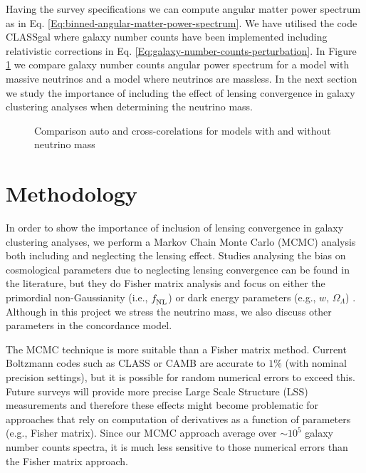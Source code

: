 Having the survey specifications we can compute angular matter power spectrum as in Eq. \eqref{Eq:binned-angular-matter-power-spectrum}. We have utilised the code CLASSgal \cite{DiDio:2013bqa} where galaxy number counts have been implemented including relativistic corrections in Eq. \eqref{Eq:galaxy-number-counts-perturbation}. In Figure \ref{Fig:comparison-massive-massless-Cls} we compare galaxy number counts angular power spectrum for a model with massive neutrinos and a model where neutrinos are massless. In the next section we study the importance of including the effect of lensing convergence in galaxy clustering analyses when determining the neutrino mass. 

\begin{figure}[hbtp]
\centering
\caption{Comparison auto and cross-corelations for models with and without neutrino mass}
\label{Fig:comparison-massive-massless-Cls}
\end{figure}
 
\section{Methodology}
\label{chapter-mnu:methodology}

In order to show the importance of inclusion of lensing convergence in galaxy clustering analyses, we perform a Markov Chain Monte Carlo (MCMC) analysis  both including and neglecting the lensing effect. Studies analysing the bias on cosmological parameters due to neglecting lensing convergence can be found in the literature, but they do Fisher matrix analysis and focus on either the primordial non-Gaussianity (i.e., $f_{\rm NL}^{}$)  or dark energy parameters (e.g., $w,\, \Omega_\Lambda$) . Although in this project we stress the neutrino mass, we also discuss other parameters in the concordance model.  

The MCMC technique is more suitable than a Fisher matrix method. Current Boltzmann codes such as CLASS  or CAMB  are accurate to $1\%$ (with nominal precision settings), but it is possible for random numerical errors to exceed this. Future surveys will provide more precise Large Scale Structure (LSS) measurements and therefore these effects might become problematic for approaches that rely on computation of derivatives as a function of parameters (e.g., Fisher matrix). Since our MCMC approach average over $\sim 10^5$ galaxy number counts spectra, it is much less sensitive to those numerical errors than the Fisher matrix approach. 

